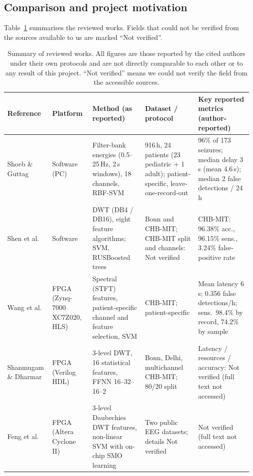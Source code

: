 \documentclass[10pt,twocolumn,letterpaper]{article}
\begin{document}
\subsection{Comparison and project motivation}

Table~\ref{tab:lit} summarises the reviewed works. Fields that could not
be verified from the sources available to us are marked ``Not
verified''.

\begin{table}[t]
\centering
\caption{Summary of reviewed works. All figures are those reported by
the cited authors under their own protocols and are not directly
comparable to each other or to any result of this project. ``Not
verified'' means we could not verify the field from the accessible
sources.}
\label{tab:lit}
\footnotesize
\begin{tabularx}{\textwidth}{@{}p{1.9cm}p{2.3cm}XXX@{}}
\toprule
Reference & Platform & Method (as reported) & Dataset / protocol & Key reported metrics (author-reported) \\
\midrule
Shoeb \& Guttag \cite{shoeb2010icml} & Software (PC)
  & Filter-bank energies (0.5--25\,Hz, 2\,s windows), 18 channels, RBF-SVM
  & 916\,h, 24 patients (23 pediatric + 1 adult); patient-specific, leave-one-record-out
  & 96\% of 173 seizures; median delay 3\,s (mean 4.6\,s); median 2 false detections / 24\,h \\
Shen et al. \cite{shen2022dwt} & Software
  & DWT (DB4 / DB16), eight feature algorithms; SVM, RUSBoosted trees
  & Bonn and CHB-MIT; CHB-MIT split and channels: Not verified
  & CHB-MIT: 96.38\% acc., 96.15\% sens., 3.24\% false-positive rate \\
Wang et al. \cite{wang2017integrating} & FPGA (Zynq-7000 XC7Z020, HLS)
  & Spectral (STFT) features, patient-specific channel and feature selection, SVM
  & CHB-MIT; patient-specific
  & Mean latency 6\,s; 0.356 false detections/h; sens.\ 98.4\% by record, 74.2\% by sample \\
Shanmugam \& Dharmar \cite{shanmugam2025ffnn} & FPGA (Verilog HDL)
  & 3-level DWT, 16 statistical features, FFNN 16--32--16--2
  & Bonn, Delhi, multichannel CHB-MIT; 80/20 split
  & Latency / resources / accuracy: Not verified (full text not accessed) \\
Feng et al. \cite{feng2018vlsi} & FPGA (Altera Cyclone II)
  & 3-level Daubechies DWT features, non-linear SVM with on-chip SMO learning
  & Two public EEG datasets; details Not verified
  & Not verified (full text not accessed) \\

\end{tabularx}
\end{table}
\end{document}
